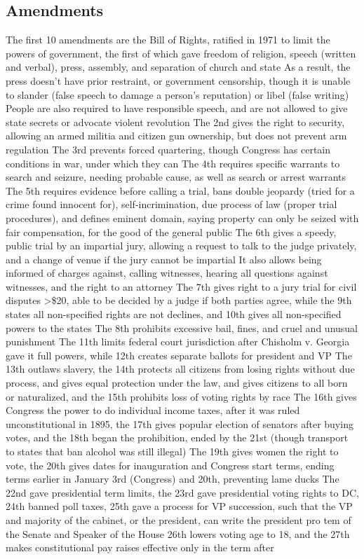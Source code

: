 \documentclass[11 pt, twoside]{article}
\newenvironment{outline*}
{
	\begin{outline}[enumerate]
	}
	{\end{outline}
}
\begin{document}
\subsection{Amendments}
\begin{outline*}
\1 The first 10 amendments are the Bill of Rights, ratified in 1971 to limit the powers of government, the first of which gave freedom of religion, speech (written and verbal), press, assembly, and separation of church and state
\2 As a result, the press doesn’t have prior restraint, or government censorship, though it is unable to slander (false speech to damage a person’s reputation) or libel (false writing)
\2 People are also required to have responsible speech, and are not allowed to give state secrets or advocate violent revolution
\1 The 2nd gives the right to security, allowing an armed militia and citizen gun ownership, but does not prevent arm regulation
\1 The 3rd prevents forced quartering, though Congress has certain conditions in war, under which they can
\1 The 4th requires specific warrants to search and seizure, needing probable cause, as well as search or arrest warrants
\1 The 5th requires evidence before calling a trial, bans double jeopardy (tried for a crime found innocent for), self-incrimination, due process of law (proper trial procedures), and defines eminent domain, saying property can only be seized with fair compensation, for the good of the general public
\1 The 6th gives a speedy, public trial by an impartial jury, allowing a request to talk to the judge privately, and a change of venue if the jury cannot be impartial
\2 It also allows being informed of charges against, calling witnesses, hearing all questions against witnesses, and the right to an attorney
\1 The 7th gives right to a jury trial for civil disputes >\$20, able to be decided by a judge if both parties agree, while the 9th states all non-specified rights are not declines, and 10th gives all non-specified powers to the states
\2 The 8th prohibits excessive bail, fines, and cruel and unusual punishment
\1 The 11th limits federal court jurisdiction after Chisholm v. Georgia gave it full powers, while 12th creates separate ballots for president and VP
\1 The 13th outlaws slavery, the 14th protects all citizens from losing rights without due process, and gives equal protection under the law, and gives citizens to all born or naturalized, and the 15th prohibits loss of voting rights by race
\1 The 16th gives Congress the power to do individual income taxes, after it was ruled unconstitutional in 1895, the 17th gives popular election of senators after buying votes, and the 18th began the prohibition, ended by the 21st (though transport to states that ban alcohol was still illegal)
\2 The 19th gives women the right to vote, the 20th gives dates for inauguration and Congress start terms, ending terms earlier in January 3rd (Congress) and 20th, preventing lame ducks
\2 The 22nd gave presidential term limits, the 23rd gave presidential voting rights to DC, 24th banned poll taxes, 25th gave a process for VP succession, such that the VP and majority of the cabinet, or the president, can write the president pro tem of the Senate and Speaker of the House
\2 26th lowers voting age to 18, and the 27th makes constitutional pay raises effective only in the term after
\end{outline*}
\end{document}
